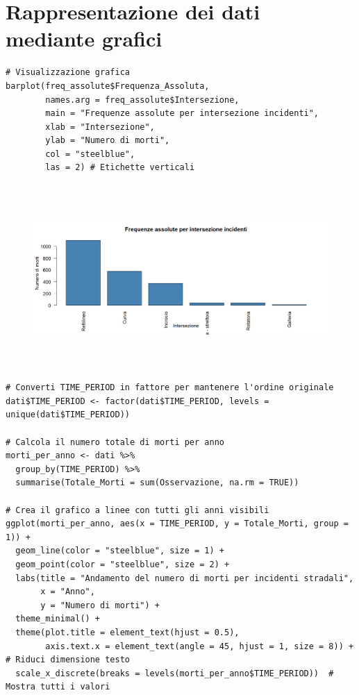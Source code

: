 \documentclass[14pt, openany, titlepage]{report} %
\begin{document}
\normalsize

\chapter{Rappresentazione dei dati mediante grafici}
\begin{center}
\begin{lstlisting}[breaklines=true]
# Visualizzazione grafica
barplot(freq_assolute$Frequenza_Assoluta, 
        names.arg = freq_assolute$Intersezione,
        main = "Frequenze assolute per intersezione incidenti",
        xlab = "Intersezione",
        ylab = "Numero di morti",
        col = "steelblue",
        las = 2) # Etichette verticali
\end{lstlisting}  
\end{center}

\begin{figure}[H] %
    \centering
    \includegraphics[width=13cm, height=7cm]{Rplot.png} %
\end{figure}

\begin{center}
\begin{lstlisting}[breaklines=true]
# Converti TIME_PERIOD in fattore per mantenere l'ordine originale
dati$TIME_PERIOD <- factor(dati$TIME_PERIOD, levels = unique(dati$TIME_PERIOD))

# Calcola il numero totale di morti per anno
morti_per_anno <- dati %>%
  group_by(TIME_PERIOD) %>%
  summarise(Totale_Morti = sum(Osservazione, na.rm = TRUE))

# Crea il grafico a linee con tutti gli anni visibili
ggplot(morti_per_anno, aes(x = TIME_PERIOD, y = Totale_Morti, group = 1)) +
  geom_line(color = "steelblue", size = 1) +
  geom_point(color = "steelblue", size = 2) +
  labs(title = "Andamento del numero di morti per incidenti stradali",
       x = "Anno",
       y = "Numero di morti") +
  theme_minimal() +
  theme(plot.title = element_text(hjust = 0.5),
        axis.text.x = element_text(angle = 45, hjust = 1, size = 8)) +  # Riduci dimensione testo
  scale_x_discrete(breaks = levels(morti_per_anno$TIME_PERIOD))  # Mostra tutti i valori
\end{lstlisting}  
\end{center}
\end{document}

